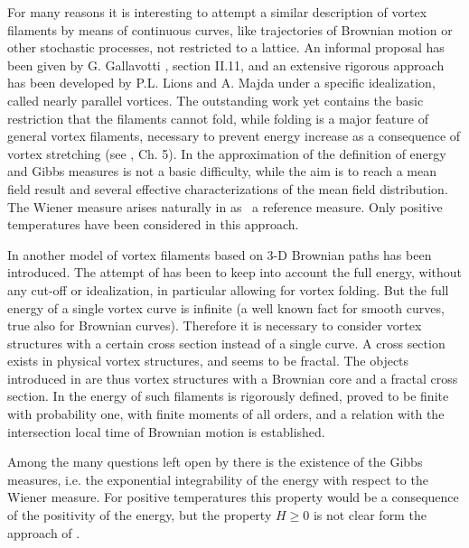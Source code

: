 For many reasons it is interesting to attempt a similar description of
vortex filaments by means of continuous curves, like trajectories of
Brownian motion or other stochastic processes, not restricted to a lattice.
An informal proposal has been given by G. Gallavotti \cite{Ga}, section
II.11, and an extensive rigorous approach has been developed by P.L. Lions
and A. Majda \cite{PLL - M} under a specific idealization, called nearly
parallel vortices. The outstanding work \cite{PLL - M} yet contains the
basic restriction that the filaments cannot fold, while folding is a major
feature of general vortex filaments, necessary to prevent energy increase as
a consequence of vortex stretching (see \cite{Ch}, Ch. 5). In the
approximation of \cite{PLL - M} the definition of energy and Gibbs measures
is not a basic difficulty, while the aim is to reach a mean field result and
several effective characterizations of the mean field distribution. The
Wiener measure arises naturally in \cite{PLL - M} as \ a reference measure.
Only positive temperatures have been considered in this approach.

In \cite{Fl2} another model of vortex filaments based on 3-D Brownian paths has
been introduced. The attempt of \cite{Fl2} has been to keep into account the
full energy, without any cut-off or idealization, in particular allowing for
vortex folding. But the full energy of a single vortex curve is infinite (a
well known fact for smooth curves, true also for Brownian curves). Therefore
it is necessary to consider vortex structures with a certain cross section
instead of a single curve. A cross section exists in physical vortex
structures, and seems to be fractal. The objects introduced in \cite{Fl2}
are thus vortex structures with a Brownian core and a fractal cross section.
In \cite{Fl2} the energy of such filaments is rigorously defined, proved to
be finite with probability one, with finite moments of all orders, and a
relation with the intersection local time of Brownian motion is established.

Among the many questions left open by \cite{Fl2} there is the existence of
the Gibbs measures, i.e. the exponential integrability of the energy with
respect to the Wiener measure. For positive temperatures this property would
be a consequence of the positivity of the energy, but the property $H\geq0$
is not clear form the approach of \cite{Fl2}.

